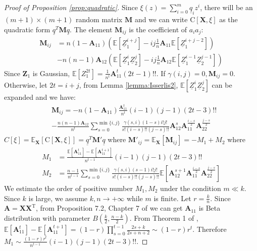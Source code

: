 \documentclass[conference]{IEEEtran}
\def\E{\mathbb{E}}
\def\T{\mathrm{T}}
\newcommand{\ide}[2]{ \gamma(#1,#2) }
\begin{document}
\begin{proof}[Proof of Proposition \ref{prop:quadratic}]
Since 
$\xi(z) = \sum_{i=0}^m \underline{q}_i z^i $,
there will be an $(m+1) \times (m+1) $ random matrix $\bm{M}$ and
we can write $\mathrm{C}[\bm{X}, \xi]$
as the quadratic form $ \underline{q}^T \bm{M} \underline{q} $.
The element $\bm{M}_{ij}$ is the coefficient of $a_ia_j$:
\begin{align*}
    \bm{M}_{ij} &= n(1-\bm{A}_{11}) (\E[\underline{Z}_1^{i+j}] -
    ij \frac{1}{n}\bm{A}_{11} \E[\underline{Z}_1^{i+j-2}])  \\
    &-n(n-1)\bm{A}_{12}(\E[\underline{Z}_1^i \underline{Z}_2^j] - ij \frac{1}{n}\bm{A}_{12}\E[\underline{Z}_1^{i-1}\underline{Z}_2^{j-1}])
\end{align*}
Since $\bm{Z}_1$ is Gaussian, $\E[Z_1^{2t}] = \frac{1}{n^t}\bm{A}_{11}^t (2t-1)!!$. If $\ide{i}{j} = 0, \bm{M}_{ij}=0$. Otherwise,
let $ 2t = i + j $, from Lemma \ref{lemma:Isserlis2}, $\E[\underline{Z}_1^i \underline{Z}_2^j]$ can be expanded and we have:
\begin{align*}
    &\bm{M}_{ij} = -n(1-\bm{A}_{11}) \frac{\bm{A}_{11}^t}{n^t}(i-1)(j-1)(2t-3)!! \\
    &-\frac{n(n-1)\bm{A}_{12}}{n^t}\sum_{s=0}^{\min\{i,j\}}
    \frac{\ide{s}{i}(1-s)i!j!}{s!(i-s)!!(j-s)!!}
    \bm{A}_{12}^s \bm{A}_{11}^{\frac{i - s}{2}}\bm{A}_{22}^{\frac{j - s}{2}}
\end{align*}
$C[\xi] = \E_{\bm{X}}[\mathrm{C}[\bm{X}, \xi]] =  \underline{q}^T \mathbf{M}' \underline{q}$ where $\mathbf{M}'_{ij} = \E_{\bm{X}} [\bm{M}_{ij}] = -M_1 + M_2$
where 
\begin{align*}
    M_1 & =   \frac{\E[\bm{A}_{11}^t]-\E[\bm{A}_{11}^{t+1}]}{n^{t-1}}(i-1)(j-1)(2t-3)!! \\
    M_2 & = \frac{n-1}{n^{t-1}}\sum_{s=0}^{\min\{i,j\}}
    \frac{\ide{s}{i}(s-1)i!j!}{s!(i-s)!!(j-s)!!}
    \E[\bm{A}_{12}^{s+1} \bm{A}_{11}^{\frac{i - s}{2}}\bm{A}_{22}^{\frac{j - s}{2}}]
\end{align*}
We estimate the order of positive number $M_1, M_2$ under the condition $ m \ll k$. Since $k$ is large, we assume $k, n \to +\infty$ while $m$ is finite. Let $ r= \frac{k}{n}$. Since $\bm{A}=\bm{X}\bm{X}^\T$, from Proposition 7.2, Chapter 7 of \cite{eaton1989group} we can get $\bm{A}_{11}$ is Beta distribution with parameter $B(\frac{k}{2}, \frac{n-k}{2})$.
From Theorem 1 of \cite{multivariateBeta},
$\E[\bm{A}_{11}^t]-\E[\bm{A}_{11}^{t+1}] = (1-r)\prod_{s=0}^{t-1} \frac{2s+k}{2s+n+2} \sim (1-r)r^t$. Therefore $M_1 \sim \frac{(1-r)r^t}{n^{t-1}}(i-1)(j-1)(2t-3)!!$.

\end{proof}
\end{document}
